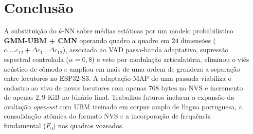 \documentclass[9pt,technote,a4paper]{IEEEtran}
\begin{document}
\section{Conclusão}
\label{sec:conclusao}

A substituição do $k$-NN sobre médias estáticas por um modelo probabilístico \textbf{GMM-UBM + CMN} operando quadro a quadro em $24$ dimensões ($c_1\dots c_{12} + \Delta c_1\dots \Delta c_{12}$), associada ao VAD passa-banda adaptativo, supressão espectral controlada ($\alpha = 0{,}8$) e veto por modulação articulatória, eliminou o viés acústico de cômodo e ampliou em mais de uma ordem de grandeza a separação entre locutores no ESP32-S3. A adaptação MAP de uma passada viabiliza o cadastro ao vivo de novos locutores com apenas $768\text{ bytes}$ na NVS e incremento de apenas $2{,}9\text{ KiB}$ no binário final. Trabalhos futuros incluem a expansão da avaliação \textit{open-set} com UBM treinado em corpus amplo de língua portuguesa, a consolidação atômica do formato NVS e a incorporação de frequência fundamental ($F_0$) nos quadros vozeados.
\end{document}
